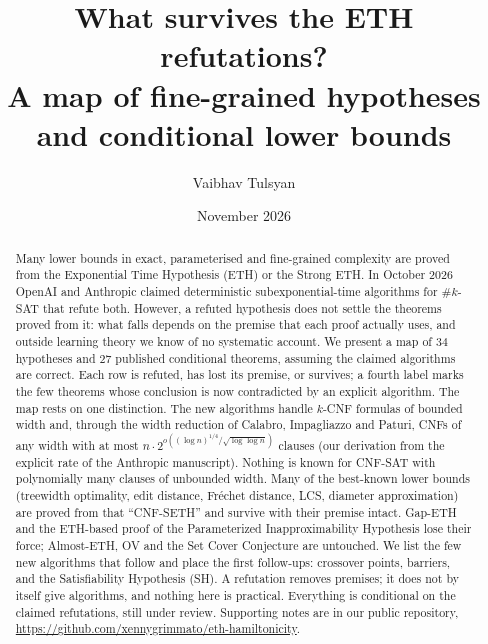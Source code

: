 \documentclass[10pt]{amsart}
\theoremstyle{plain}
\theoremstyle{definition}
\theoremstyle{remark}
\numberwithin{equation}{section}
\begin{document}
\title[What survives the ETH refutations?]{What survives the ETH refutations?\\ A map of fine-grained hypotheses\\ and conditional lower bounds}

\author{Vaibhav Tulsyan}

\date{November 2026}


\begin{abstract}
Many lower bounds in exact, parameterised and fine-grained complexity are proved from the
Exponential Time Hypothesis (ETH) or the Strong ETH. In October 2026 OpenAI and Anthropic claimed
deterministic subexponential-time algorithms for $\#k$-SAT that refute both. However, a refuted
hypothesis does not settle the theorems proved from it: what falls depends on the premise that each
proof actually uses, and outside learning theory we know of no systematic account. We present a map of $34$
hypotheses and $27$ published conditional theorems, assuming the claimed algorithms are correct.
Each row is refuted, has lost its premise, or survives; a fourth label marks the few theorems whose
conclusion is now contradicted by an explicit algorithm. The map rests on one distinction. The new
algorithms handle $k$-CNF formulas of bounded width and, through the width reduction of Calabro,
Impagliazzo and Paturi, CNFs of any width with at most $n\cdot 2^{o((\log n)^{1/4}/\sqrt{\log\log n})}$
clauses (our derivation from the explicit rate of the Anthropic manuscript). Nothing is
known for CNF-SAT with polynomially many clauses of unbounded width. Many of the best-known lower
bounds (treewidth optimality, edit distance, Fr\'echet distance, LCS, diameter approximation) are
proved from that ``CNF-SETH'' and survive with their premise intact. Gap-ETH and the ETH-based proof
of the Parameterized Inapproximability Hypothesis lose their force; Almost-ETH, OV and
the Set Cover Conjecture are untouched. We list the few new algorithms that follow and place the
first follow-ups: crossover points, barriers, and the Satisfiability Hypothesis (SH). A refutation
removes premises; it does not by itself give algorithms, and nothing here is practical. Everything
is conditional on the claimed refutations, still under review. Supporting notes are in our
public repository, \url{https://github.com/xennygrimmato/eth-hamiltonicity}.
\end{abstract}
\end{document}
